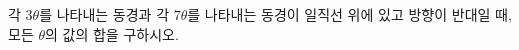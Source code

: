 각 $3\theta$를 나타내는 동경과 각 $7\theta$를 나타내는 동경이 일직선 위에 있고 방향이 반대일 때, 모든 $\theta$의 값의 합을 구하시오. \dmcondfill{$\pi<\theta<2\pi$}{}
